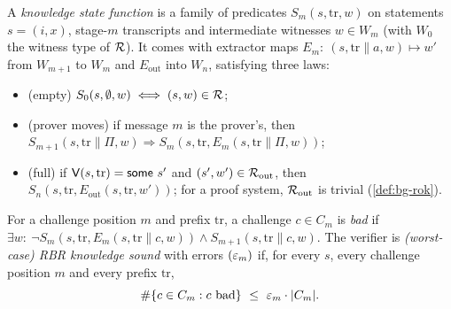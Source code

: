 \begin{definition}\label{def:bg-rbrks-warp}
A \emph{knowledge state function} is a family of predicates $S_m(s,\mathrm{tr},w)$ on statements
$s=(i,x)$, stage-$m$ transcripts and intermediate witnesses $w\in W_m$ (with $W_0$ the witness
type of $\mathcal{R}$). It comes with extractor maps $E_m:\ (s,\mathrm{tr}\|a,w)\mapsto w'$ from $W_{m+1}$
to $W_m$ and $E_{\mathrm{out}}$ into $W_n$, satisfying three laws:
\begin{itemize}[nosep]
  \item (empty) $S_0(s,\emptyset,w)\iff (s,w)\in\mathcal{R}$;
  \item (prover moves) if message $m$ is the prover's, then
    $S_{m+1}(s,\mathrm{tr}\|\Pi,w)\Rightarrow S_m(s,\mathrm{tr},E_m(s,\mathrm{tr}\|\Pi,w))$;
  \item (full) if $\mathsf{V}(s,\mathrm{tr})=\mathsf{some}\ s'$ and $(s',w')\in\mathcal{R}_{\mathrm{out}}$, then
    $S_n(s,\mathrm{tr},E_{\mathrm{out}}(s,\mathrm{tr},w'))$; for a proof system,
    $\mathcal{R}_{\mathrm{out}}$ is trivial (\cref{def:bg-rok}).
\end{itemize}
For a challenge position $m$ and prefix $\mathrm{tr}$, a challenge $c\in C_m$ is \emph{bad} if
$\exists w:\ \neg S_m(s,\mathrm{tr},E_m(s,\mathrm{tr}\|c,w))\wedge S_{m+1}(s,\mathrm{tr}\|c,w)$.
The verifier is \emph{(worst-case) RBR knowledge sound} with errors $(\varepsilon_m)$ if, for every $s$,
every challenge position $m$ and every prefix $\mathrm{tr}$,
\[ \#\{c\in C_m : c \text{ bad}\}\ \le\ \eps_m\cdot|C_m| . \]
\end{definition}

